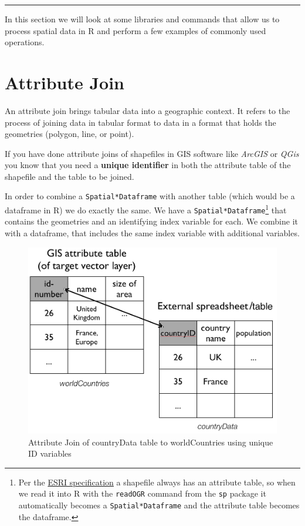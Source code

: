 \documentclass[]{book}
\let\rmarkdownfootnote\footnote%
\def\footnote{\protect\rmarkdownfootnote}
\theoremstyle{definition}
\theoremstyle{definition}
\theoremstyle{definition}
\theoremstyle{remark}
\begin{document}
\begin{center}\rule{0.5\linewidth}{\linethickness}\end{center}

In this section we will look at some libraries and commands that allow
us to process spatial data in R and perform a few examples of commonly
used operations.

\section{Attribute Join}\label{attribute-join}

An attribute join brings tabular data into a geographic context. It
refers to the process of joining data in tabular format to data in a
format that holds the geometries (polygon, line, or point).

If you have done attribute joins of shapefiles in GIS software like
\emph{ArcGIS} or \emph{QGis} you know that you need a \textbf{unique
identifier} in both the attribute table of the shapefile and the table
to be joined.

In order to combine a \texttt{Spatial*Dataframe} with another table
(which would be a dataframe in R) we do exactly the same. We have a
\texttt{Spatial*Dataframe}\footnote{Per the
  \href{http://www.esri.com/library/whitepapers/pdfs/shapefile.pdf}{ESRI
  specification} a shapefile always has an attribute table, so when we
  read it into R with the \texttt{readOGR} command from the \texttt{sp}
  package it automatically becomes a \texttt{Spatial*Dataframe} and the
  attribute table becomes the dataframe.} that contains the geometries
and an identifying index variable for each. We combine it with a
dataframe, that includes the same index variable with additional
variables.

\begin{figure}
\centering
\includegraphics{img/attrJoin.png}
\caption{Attribute Join of countryData table to worldCountries using
unique ID variables}
\end{figure}
\end{document}
